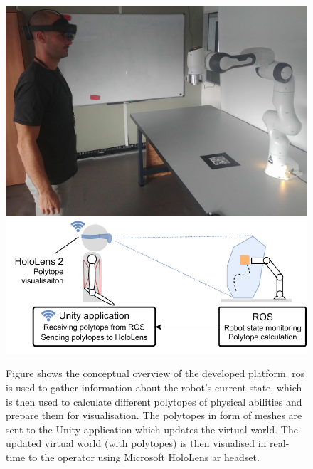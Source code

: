 \begin{figure}[!h]
    \centering
    \includegraphics[width=0.39\linewidth,valign=t]{Papers/images/human_ar.jpg}
    \includegraphics[width=0.6\linewidth,valign=t]{Papers/images/unity_visualisation.pdf}
    \caption{Figure shows the conceptual overview of the developed platform. \gls{ros} is used to gather information about the robot's current state, which is then used to calculate different polytopes of physical abilities and prepare them for visualisation. The polytopes in form of meshes are sent to the Unity application which updates the virtual world. The updated virtual world (with polytopes) is then visualised in real-time to the operator using Microsoft HoloLens \gls{ar} headset.}
    \label{fig:unity_visual}
\end{figure}



